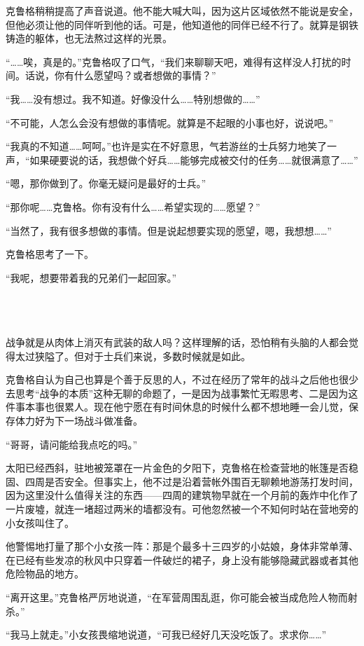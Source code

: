 克鲁格稍稍提高了声音说道。他不能大喊大叫，因为这片区域依然不能说是安全，但他必须让他的同伴听到他的话。可是，他知道他的同伴已经不行了。就算是钢铁铸造的躯体，也无法熬过这样的光景。

“……唉，真是的。”克鲁格叹了口气，“我们来聊聊天吧，难得有这样没人打扰的时间。话说，你有什么愿望吗？或者想做的事情？”

“我……没有想过。我不知道。好像没什么……特别想做的……”

“不可能，人怎么会没有想做的事情呢。就算是不起眼的小事也好，说说吧。”

“我真的不知道……呵呵。”也许是实在不好意思，气若游丝的士兵努力地笑了一声，“如果硬要说的话，我想做个好兵……能够完成被交付的任务……就很满意了……”

“嗯，那你做到了。你毫无疑问是最好的士兵。”

“那你呢……克鲁格。你有没有什么……希望实现的……愿望？”

“当然了，我有很多想做的事情。但是说起想要实现的愿望，嗯，我想想……”

克鲁格思考了一下。

“我呢，想要带着我的兄弟们一起回家。”

 \section*{}

战争就是从肉体上消灭有武装的敌人吗？这样理解的话，恐怕稍有头脑的人都会觉得太过狭隘了。但对于士兵们来说，多数时候就是如此。

克鲁格自认为自己也算是个善于反思的人，不过在经历了常年的战斗之后他也很少去思考“战争的本质”这种无聊的命题了，一是因为战事繁忙无暇思考、二是因为这件事本事也很累人。现在他宁愿在有时间休息的时候什么都不想地睡一会儿觉，保存体力好为下一场战斗做准备。

“哥哥，请问能给我点吃的吗。”

太阳已经西斜，驻地被笼罩在一片金色的夕阳下，克鲁格在检查营地的帐篷是否稳固、四周是否安全。但事实上，他不过是沿着营帐外围百无聊赖地游荡打发时间，因为这里没什么值得关注的东西——四周的建筑物早就在一个月前的轰炸中化作了一片废墟，就连一堵超过两米的墙都没有。可他忽然被一个不知何时站在营地旁的小女孩叫住了。

他警惕地打量了那个小女孩一阵：那是个最多十三四岁的小姑娘，身体非常单薄、在已经有些发凉的秋风中只穿着一件破烂的裙子，身上没有能够隐藏武器或者其他危险物品的地方。

“离开这里。”克鲁格严厉地说道，“在军营周围乱逛，你可能会被当成危险人物而射杀。”

“我马上就走。”小女孩畏缩地说道，“可我已经好几天没吃饭了。求求你……”

